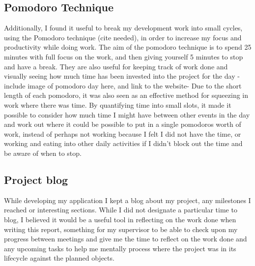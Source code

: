 \subsection{Pomodoro Technique}
Additionally, I found it useful to break my development work into small cycles, using the Pomodoro technique (cite needed), in order to increase my focus and productivity while doing work. The aim of the pomodoro technique is to spend 25 minutes with full focus on the work, and then giving yourself 5 minutes to stop and have a break. They are also useful for keeping track of work done and visually seeing how much time has been invested into the project for the day -include image of pomodoro day here, and link to the website-
Due to the short length of each pomodoro, it was also seen as an effective method for squeezing in work where there was time. By quantifying time into small slots, it made it possible to consider how much time I might have between other events in the day and work out where it could be possible to put in a single pomodoros worth of work, instead of perhaps not working because I felt I did not have the time, or working and eating into other daily activities if I didn't block out the time and be aware of when to stop.

\subsection{Project blog}
While developing my application I kept a blog about my project, any milestones I reached or interesting sections. While I did not designate a particular time to blog, I believed it would be a useful tool in reflecting on the work done when writing this report, something for my supervisor to be able to check upon my progress between meetings and give me the time to reflect on the work done and any upcoming tasks to help me mentally process where the project was in its lifecycle against the planned objects.

